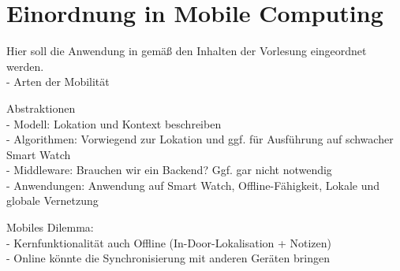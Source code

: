 \section{Einordnung in Mobile Computing}
Hier soll die Anwendung in gemäß den Inhalten der Vorlesung eingeordnet werden.
\\- Arten der Mobilität

Abstraktionen
\\- Modell: Lokation und Kontext beschreiben
\\- Algorithmen: Vorwiegend zur Lokation und ggf. für Ausführung auf schwacher Smart Watch
\\- Middleware: Brauchen wir ein Backend? Ggf. gar nicht notwendig
\\- Anwendungen: Anwendung auf Smart Watch, Offline-Fähigkeit, Lokale und globale Vernetzung

Mobiles Dilemma:
\\- Kernfunktionalität auch Offline (In-Door-Lokalisation + Notizen)
\\- Online könnte die Synchronisierung mit anderen Geräten bringen
